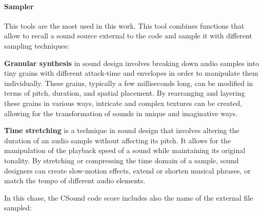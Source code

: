 		\paragraph{Sampler} This tools are the most used in this work.
		This tool combines functions that allow to recall a sound source external to the code and sample it with different sampling techniques:
		
			\begin{compactitem}
				\item \textbf{Granular synthesis} in sound design involves breaking down audio samples into tiny grains with different attack-time and envelopes in order to manipulate them individually. These grains, typically a few milliseconds long, can be modified in terms of pitch, duration, and spatial placement. By rearranging and layering these grains in various ways, intricate and complex textures can be created, allowing for the transformation of sounds in unique and imaginative ways.
				\item \textbf{Time stretching} is a technique in sound design that involves altering the duration of an audio sample without affecting its pitch. It allows for the manipulation of the playback speed of a sound while maintaining its original tonality. By stretching or compressing the time domain of a sample, sound designers can create slow-motion effects, extend or shorten musical phrases, or match the tempo of different audio elements.
			\end{compactitem}
		
		In this chase, the CSound code score includes also the name of the external file sampled:
		
